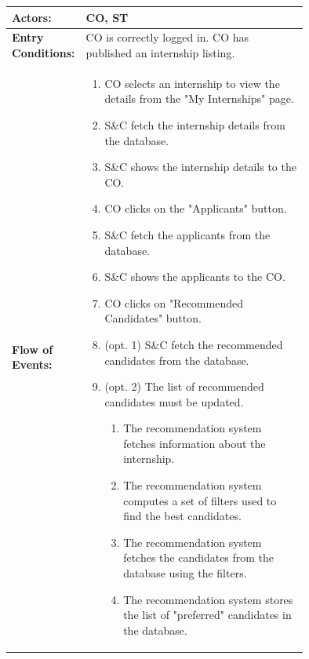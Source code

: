 \begin{center}
    \begin{longtable}{|l|p{0.75\linewidth}|}
        \hline
        \textbf{Actors:}           & CO, ST                                                                                                                \\
        \hline
        \textbf{Entry Conditions:} & CO is correctly logged in. CO has published an internship listing.                                                    \\
        \hline
        \textbf{Flow of Events:}   & \begin{enumerate}
                                         \item CO selects an internship to view the details from the "My Internships" page.
                                         \item S\&C fetch the internship details from the database.
                                         \item S\&C shows the internship details to the CO.
                                         \item CO clicks on the "Applicants" button.
                                         \item S\&C fetch the applicants from the database.
                                         \item S\&C shows the applicants to the CO.
                                         \item CO clicks on "Recommended Candidates" button.
                                         \item (opt. 1) S\&C fetch the recommended candidates from the database.
                                         \item (opt. 2) The list of recommended candidates must be updated.
                                               \begin{enumerate}
                      \item The recommendation system fetches information about the internship.
                      \item The recommendation system computes a set of filters used to find the best candidates.
                      \item The recommendation system fetches the candidates from the database using the filters.
                      \item The recommendation system stores the list of "preferred" candidates in the database.

\end{enumerate}
\end{enumerate}
\end{longtable}
\end{center}
